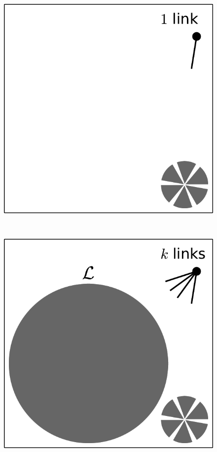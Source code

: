 \documentclass[aps, pre, onecolumn, a4paper, floatfix]{revtex4}
\begin{document}
\begin{figure}[htb]
\begin{minipage}[b]{0.05\linewidth}
  \end{minipage}
  \begin{minipage}[b]{0.18\linewidth}
    \begin{center}
      \includegraphics[width=0.99\columnwidth]{sets_gc_no1.pdf}
    \end{center}
  \end{minipage}
  \begin{minipage}[b]{0.05\linewidth}
  \ 
  \end{minipage}
  \begin{minipage}[b]{0.18\linewidth}
    \begin{center}
      \includegraphics[width=0.99\columnwidth]{sets_gc_allk.pdf}

\end{center}
\end{minipage}
\end{figure}
\end{document}
